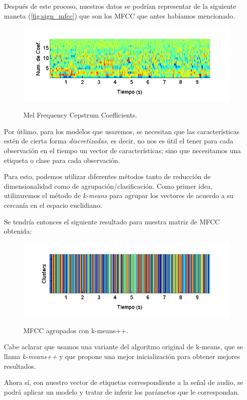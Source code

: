 Después de este proceso, nuestros datos se podrían representar de la siguiente maneta (\autoref{fig:sign_mfcc}) que son los MFCC que antes habíamos mencionado.
\begin{figure}[bth]
  \myfloatalign
  {\includegraphics[width=0.9\linewidth]{gfx/chap5/signal-mfcc}} \quad
  \caption{Mel Frequency Cepstrum Coefficients.}
  \label{fig:sign_mfcc}
\end{figure}

Por útlimo, para los modelos que usaremos, se necesitan que las características estén de cierta forma \textit{discretizadas}, es decir, no nos es útil el tener para cada observación en el tiempo un vector de características; sino que necesitamos una etiqueta o clase para cada observación. 

Para esto, podemos utilizar diferentes métodos tanto de reducción de dimensionalidad como de agrupación/clasificación. Como primer idea, utilizaremos el método de \textit{k-means} para agrupar los vectores de acuerdo a su cercanía en el espacio euclidiano.

Se tendría entonces el siguiente resultado para nuestra matriz de MFCC obtenida:
\begin{figure}[bth]
  {\includegraphics[width=0.9\linewidth]{gfx/chap5/signal-clusters}} \quad
  \caption{MFCC agrupados con k-means++.}
  \label{fig:sign_clusters}
\end{figure}
Cabe aclarar que usamos una variante del algoritmo original de k-means, que se llama \textit{k-means++} y que propone una mejor inicialización para obtener mejores resultados.

Ahora sí, con nuestro vector de etiquetas correspondiente a la señal de audio, se podrá aplicar un modelo y tratar de inferir los parámetos que le correspondan.

